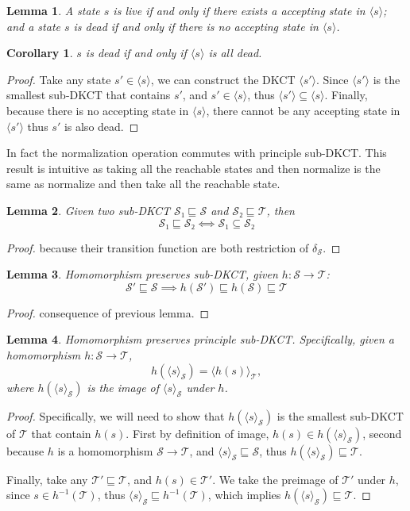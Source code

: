 \documentclass[acmsmall,screen]{acmart}
\newtheorem{corollary}{Corollary}
\newtheorem{lemma}{Lemma}
\begin{document}
\begin{lemma}
    A state \(s\) is live if and only if there exists a accepting state in \(⟨s⟩\);  
    and a state \(s\) is dead if and only if there is no accepting state in \(⟨s⟩\).
\end{lemma}

\begin{corollary}
    \(s\) is dead if and only if \(⟨s⟩\) is all dead.
\end{corollary}

\begin{proof}
    Take any state \(s' ∈ ⟨s⟩\), we can construct the DKCT \(⟨s'⟩\).
    Since \(⟨s'⟩\) is the smallest sub-DKCT that contains \(s'\), and \(s' ∈ ⟨s⟩\), thus \(⟨s'⟩ ⊆ ⟨s⟩\).
    Finally, because there is no accepting state in \(⟨s⟩\), there cannot be any accepting state in \(⟨s'⟩\) thus \(s'\) is also dead.
\end{proof}

In fact the normalization operation commutes with principle sub-DKCT. This result is intuitive as taking all the reachable states and then normalize is the same as normalize and then take all the reachable state.

\begin{lemma}
    Given two sub-DKCT \(𝒮₁ ⊑ 𝒮\) and \(𝒮₂ ⊑ 𝒯\), then \[𝒮₁ ⊑ 𝒮₂ ⟺ 𝒮₁ ⊆ 𝒮₂\]
\end{lemma}

\begin{proof}
    because their transition function are both restriction of \(δ_𝒮\).
\end{proof}

\begin{lemma}
    Homomorphism preserves sub-DKCT, given \(h: 𝒮 → 𝒯\):
    \[𝒮' ⊑ 𝒮 ⟹ h(𝒮') ⊑ h(𝒮) ⊑ 𝒯\]
\end{lemma}

\begin{proof}
    consequence of previous lemma.
\end{proof}

\begin{lemma}
    Homomorphism preserves principle sub-DKCT. Specifically, given a homomorphism \(h: 𝒮 → 𝒯\), 
    \[h(⟨s⟩_{𝒮}) = ⟨h(s)⟩_{𝒯},\]
    where \(h(⟨s⟩_{𝒮})\) is the image of \(⟨s⟩_{𝒮}\) under \(h\).
\end{lemma}

\begin{proof}
    Specifically, we will need to show that \(h(⟨s⟩_{𝒮})\) is the smallest sub-DKCT of \(𝒯\) that contain \(h(s)\). First by definition of image, \(h(s) ∈ h(⟨s⟩_{𝒮})\), second because \(h\) is a homomorphism \(𝒮 → 𝒯\), and \(⟨s⟩_{𝒮} ⊑ 𝒮\), thus \(h(⟨s⟩_{𝒮}) ⊑ 𝒯\).

    Finally, take any \(𝒯' ⊑ 𝒯\), and \(h(s) ∈ 𝒯'\). We take the preimage of \(𝒯'\) under \(h\),
    since \(s ∈ h^{-1}(𝒯)\), thus \(⟨s⟩_{𝒮} ⊑ h^{-1}(𝒯)\), which implies \(h(⟨s⟩_{𝒮}) ⊑ 𝒯\).
\end{proof}
\end{document}
